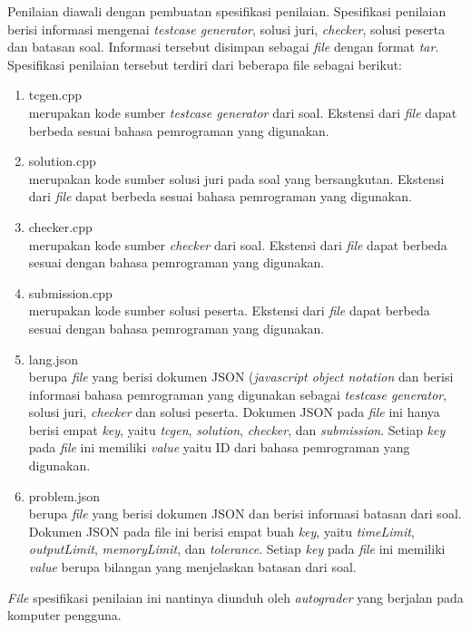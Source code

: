 \par Penilaian diawali dengan pembuatan spesifikasi penilaian. Spesifikasi penilaian berisi informasi mengenai \textit{testcase generator}, solusi juri, \textit{checker}, solusi peserta dan batasan soal. Informasi tersebut disimpan sebagai \textit{file} dengan format \textit{tar}. Spesifikasi penilaian tersebut terdiri dari beberapa file sebagai berikut:
\begin{enumerate}
    \item tcgen.cpp\\ merupakan kode sumber \textit{testcase generator} dari soal. Ekstensi dari \textit{file} dapat berbeda sesuai bahasa pemrograman yang digunakan.
    \item solution.cpp\\ merupakan kode sumber  solusi juri pada soal yang bersangkutan. Ekstensi dari \textit{file} dapat berbeda sesuai bahasa pemrograman yang digunakan.
    \item checker.cpp\\ merupakan kode sumber \textit{checker} dari soal. Ekstensi dari \textit{file} dapat berbeda sesuai dengan bahasa pemrograman yang digunakan.
    \item submission.cpp\\ merupakan kode sumber solusi peserta. Ekstensi dari \textit{file} dapat berbeda sesuai dengan bahasa pemrograman yang digunakan.
    \item lang.json\\ berupa \textit{file} yang berisi dokumen JSON (\textit{javascript object notation} dan berisi informasi bahasa pemrograman yang digunakan sebagai \textit{testcase generator}, solusi juri, \textit{checker} dan solusi peserta. Dokumen JSON pada \textit{file} ini hanya berisi empat \textit{key}, yaitu \textit{tcgen}, \textit{solution}, \textit{checker}, dan \textit{submission}. Setiap \textit{key} pada \textit{file} ini memiliki \textit{value} yaitu ID dari bahasa pemrograman yang digunakan.
    \item problem.json\\ berupa \textit{file} yang berisi dokumen JSON dan berisi informasi batasan dari soal. Dokumen JSON pada file ini berisi empat buah \textit{key}, yaitu \textit{timeLimit}, \textit{outputLimit}, \textit{memoryLimit}, dan \textit{tolerance}. Setiap \textit{key} pada \textit{file} ini memiliki \textit{value}  berupa bilangan yang menjelaskan batasan dari soal.
\end{enumerate}
\par \textit{File} spesifikasi penilaian ini nantinya diunduh oleh \textit{autograder} yang berjalan pada komputer pengguna.

